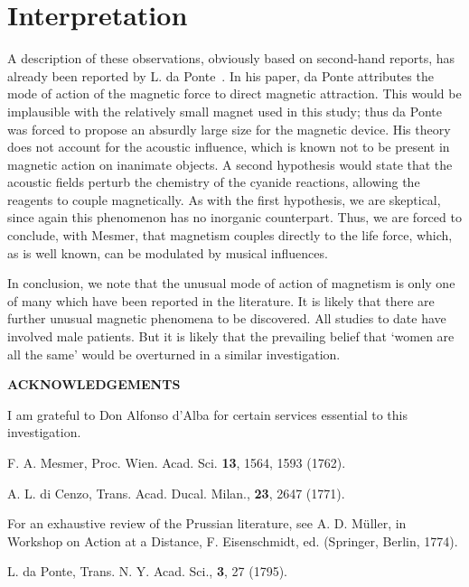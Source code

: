 \documentclass[12pt]{article}
\def\Acknowledgements{\bigskip  \bigskip \begin{center} \begin{large}
             \bf ACKNOWLEDGEMENTS \end{large}\end{center}}
\begin{document}
\section{Interpretation}

A description of these observations, obviously based on second-hand reports,
has already been reported by L. da Ponte~\cite{daPonte}. 
 In his paper,
da Ponte attributes the mode of action of the magnetic force to direct
magnetic attraction.  This would be implausible with the relatively small
magnet used in this study; thus da Ponte was forced to propose an absurdly
large size for the  magnetic device.  His theory does not account for the
acoustic influence, which is known not to be present in magnetic action on
inanimate objects.  A second hypothesis would state that the acoustic
fields perturb the chemistry of the cyanide reactions, allowing the 
reagents to couple magnetically.   As with the first hypothesis, we are
skeptical, since again this phenomenon has no inorganic counterpart.  Thus,
we are forced to conclude, with Mesmer, that magnetism couples directly to 
the life force, which, as is well known, can be modulated by musical 
influences.

In conclusion, we note that the unusual mode of action of magnetism is only
one of many which have been reported in the literature.  It is likely
that there are further unusual magnetic phenomena to be discovered.  All
studies to date have involved male patients.  But it is likely that the 
prevailing belief that `women are all the same' would be overturned in a
similar investigation.




\Acknowledgements
I am grateful to Don Alfonso d'Alba for certain services essential to 
this investigation.



\begin{thebibliography}{99}


F. A. Mesmer, Proc. Wien. Acad. Sci. {\bf 13}, 1564, 1593 (1762).

A. L. di Cenzo, Trans. Acad. Ducal.  Milan., {\bf 23}, 2647 (1771).

For an exhaustive review of the Prussian literature, see A. D. M\"uller,
in Workshop on Action at a Distance, F. Eisenschmidt, ed. (Springer,
Berlin, 1774).


L. da Ponte, Trans. N. Y. Acad. Sci., {\bf 3}, 27 (1795).


\end{thebibliography}

 
\end{document}
